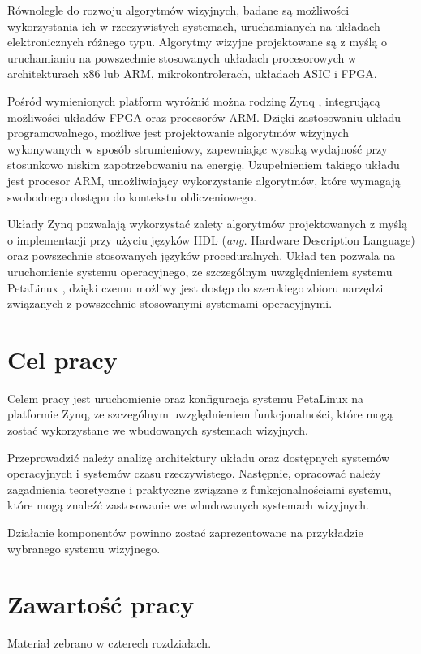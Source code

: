 Równolegle do rozwoju algorytmów wizyjnych, badane są możliwości wykorzystania ich w rzeczywistych systemach, uruchamianych na układach elektronicznych różnego typu. Algorytmy wizyjne projektowane są z myślą o uruchamianiu na powszechnie stosowanych układach procesorowych w architekturach x86 lub ARM, mikrokontrolerach, układach ASIC i FPGA.

Pośród wymienionych platform wyróżnić można rodzinę Zynq \cite{zybo-reference-manual}, integrującą możliwości układów FPGA oraz procesorów ARM. Dzięki zastosowaniu układu programowalnego, możliwe jest projektowanie algorytmów wizyjnych wykonywanych w sposób strumieniowy, zapewniając wysoką wydajność przy stosunkowo niskim zapotrzebowaniu na energię. Uzupełnieniem takiego układu jest procesor ARM, umożliwiający wykorzystanie algorytmów, które wymagają swobodnego dostępu do kontekstu obliczeniowego.

Układy Zynq pozwalają wykorzystać zalety algorytmów projektowanych z myślą o implementacji przy użyciu języków HDL (\emph{ang.} Hardware Description Language) oraz powszechnie stosowanych języków proceduralnych. Układ ten pozwala na uruchomienie systemu operacyjnego, ze szczególnym uwzględnieniem systemu PetaLinux \cite{petalinux-tools}, dzięki czemu możliwy jest dostęp do szerokiego zbioru narzędzi związanych z powszechnie stosowanymi systemami operacyjnymi.

\section{Cel pracy}
Celem pracy jest uruchomienie oraz konfiguracja systemu PetaLinux na platformie Zynq, ze szczególnym uwzględnieniem funkcjonalności, które mogą zostać wykorzystane we wbudowanych systemach wizyjnych. 

Przeprowadzić należy analizę architektury układu oraz dostępnych systemów operacyjnych i systemów czasu rzeczywistego. Następnie, opracować należy zagadnienia teoretyczne i praktyczne związane z funkcjonalnościami systemu, które mogą znaleźć zastosowanie we wbudowanych systemach wizyjnych.

Działanie komponentów powinno zostać zaprezentowane na przykładzie wybranego systemu wizyjnego.

\section{Zawartość pracy}

Materiał zebrano w czterech rozdziałach.

